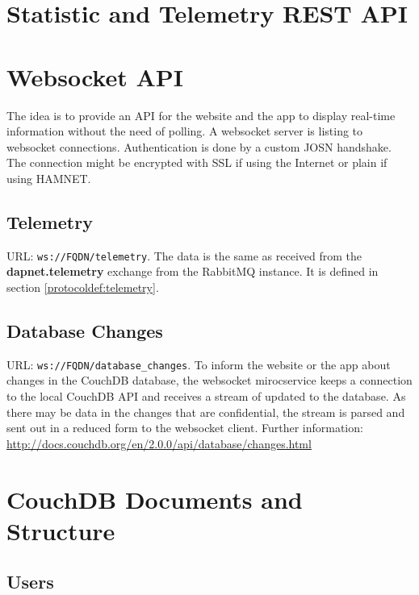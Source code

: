 \section{Statistic and Telemetry REST API}

\section{Websocket API}
\label{protocoldef:websocketapi}
The idea is to provide an API for the website and the app to display real-time information without the need of polling. A websocket server is listing to websocket connections. Authentication is done by a custom JOSN handshake. The connection might be encrypted with SSL if using the Internet or plain if using HAMNET.

\subsection{Telemetry}
\label{protcoldef:websocketapi:telemetry}
URL: \texttt{ws://FQDN/telemetry}.
The data is the same as received from the \textbf{dapnet.telemetry} exchange from the RabbitMQ instance. It is defined in section \ref{protocoldef:telemetry}.

\subsection{Database Changes}
\label{protcoldef:websocketapi:databasechanges}
URL: \texttt{ws://FQDN/database\_changes}.
To inform the website or the app about changes in the CouchDB database, the websocket mirocservice keeps a connection to the local CouchDB API and receives a stream of updated to the database. As there may be data in the changes that are confidential, the stream is parsed and sent out in a reduced form to the websocket client. Further information: \url{http://docs.couchdb.org/en/2.0.0/api/database/changes.html}

\section{CouchDB Documents and Structure}



\subsection{Users}

